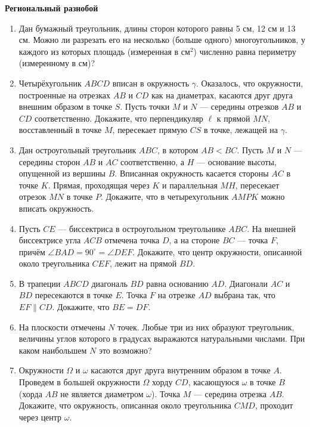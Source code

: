 \documentclass{article}
\begin{document}
\large
	
\begin{center}
	\textbf{Региональный разнобой}
\end{center}


\begin{enumerate}[label*=\protect\fbox{\arabic{enumi}}]
	
\item Дан бумажный треугольник, длины сторон которого равны 5 см,
12 см и 13 см. Можно ли разрезать его на несколько (больше одного) многоугольников, у каждого из которых площадь (измеренная в см$^2$) численно равна периметру (измеренному в см)?

\item Четырёхугольник $ABCD$ вписан в окружность $\gamma$. Оказалось, что окружности, построенные на отрезках $AB$ и $CD$ как на диаметрах, касаются друг друга внешним образом в точке $S$. Пусть точки $M$ и $N$ — середины отрезков $AB$ и $CD$ соответственно. Докажите, что перпендикуляр $\ell$ к прямой $MN$, восставленный в точке $M$, пересекает прямую $CS$ в точке, лежащей на $\gamma$.

\item Дан остроугольный треугольник $ABC$, в котором $AB < BC$. Пусть $M$ и $N$ — середины сторон $AB$ и $AC$ соответственно, а $H$ — основание высоты, опущенной из вершины $B$. Вписанная окружность касается стороны $AC$ в точке $K$. Прямая, проходящая через $K$ и параллельная $MH$, пересекает отрезок $MN$ в точке $P$. Докажите, что в четырехугольник $AMPK$ можно вписать окружность.

\item  Пусть $CE$ — биссектриса в остроугольном треугольнике $ABC$. На внешней биссектрисе угла $ACB$ отмечена точка $D$, а на стороне $BC$ — точка $F$, причём $\angle BAD = 90^\circ = \angle DEF$. Докажите, что центр окружности, описанной около треугольника $CEF$, лежит на прямой $BD$.

\item  В трапеции $ABCD$ диагональ $BD$ равна основанию $AD$. Диагонали $AC$ и $BD$ пересекаются в точке $E$. Точка $F$ на отрезке $AD$ выбрана так, что $EF \parallel CD$. Докажите, что $BE = DF$.

\item На плоскости отмечены $N$ точек. Любые три из них образуют треугольник, величины углов которого в градусах выражаются натуральными числами. При каком наибольшем $N$ это возможно?

\item Окружности $\Omega$ и $\omega$ касаются друг друга внутренним образом в точке $A$. Проведем в большей окружности $\Omega$ хорду $CD$, касающуюся $\omega$ в точке $B$ (хорда $AB$ не является диаметром $\omega$). Точка $M$ — середина отрезка $AB$. Докажите, что окружность, описанная около треугольника $CMD$, проходит через центр $\omega$.


\end{enumerate}
\end{document}
